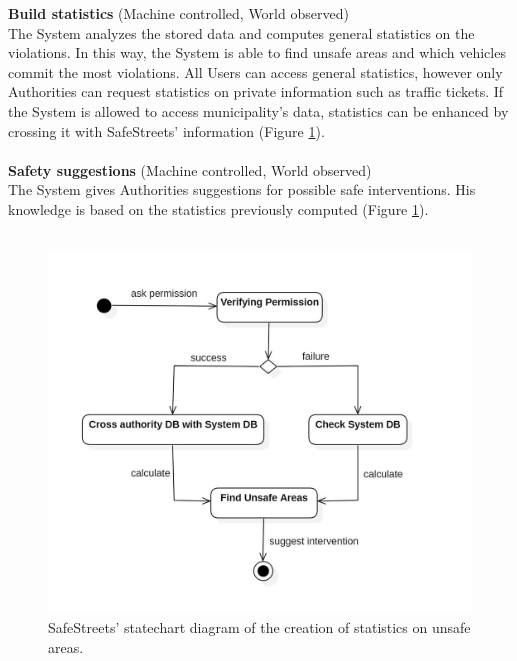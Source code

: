 \documentclass{report}
\begin{document}
\newpage
\noindent \textbf{Build statistics} (Machine controlled, World observed)\\
The System analyzes the stored data and computes general statistics on the violations. In this way, the System is able to find unsafe areas and which vehicles commit the most violations. All Users can access general statistics, however only Authorities can request statistics on private information such as traffic tickets. If the System is allowed to access municipality's data, statistics can be enhanced by crossing it with SafeStreets' information (Figure \ref{fig:State2}).  \\
\\
\textbf{Safety suggestions} (Machine controlled, World observed)\\
The System gives Authorities suggestions for possible safe interventions. His knowledge is based on the statistics previously computed (Figure \ref{fig:State2}).\\
\\

\begin{figure}[!ht]
\begin{center}
\includegraphics[width=.8\textwidth]{./img/img_UnsafeAreas.jpg}
\end{center}
\caption{SafeStreets' statechart diagram of the creation of statistics on unsafe areas.}
\label{fig:State2}
\end{figure}

\newpage
\end{document}
